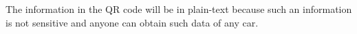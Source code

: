The information in the QR code will be in plain-text because such an information is not 
sensitive and anyone can obtain such data of any car.




